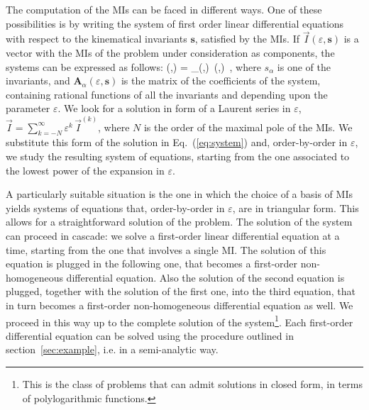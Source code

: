 The computation of the MIs can be faced in different ways. One of these possibilities is by writing the system of first order linear differential equations with respect to the kinematical invariants $\mathbf{s}$, satisfied by the MIs. If $\vec{I}(\varepsilon,\mathbf{s})$ is a vector with the MIs of the problem under consideration as components, the systems can be expressed as follows:
\be
\label{eq:system}
 (\varepsilon,)
= _\alpha(\varepsilon,)\, (\varepsilon,)\, ,
\ee
where $s_\alpha$ is one of the invariants, 
and $\mathbf{A}_\alpha(\varepsilon,\mathbf{s})$ is the matrix of the coefficients of the system, containing rational functions of all the invariants and depending upon the parameter $\varepsilon$. We look for a solution in form of a Laurent series in $\varepsilon$, $\vec{I}=\sum_{k=-N}^{\infty} \varepsilon^k \, \vec{I}^{(k)}$, where $N$ is the order of the maximal pole of the MIs. We substitute this form of the solution in Eq.~(\ref{eq:system}) and, order-by-order in $\varepsilon$, we study the resulting system of equations, starting from the one associated to the lowest power of the expansion in $\varepsilon$.

A particularly suitable situation is the one in which the choice of a basis of MIs yields systems of equations that, order-by-order in $\varepsilon$, are in triangular form. This allows for a straightforward solution of the problem. The solution of the system can proceed in cascade: we solve a first-order linear differential equation at a time, starting from the one that involves a single MI. The solution of this equation is plugged in the following one, that becomes a first-order non-homogeneous differential equation. Also the solution of the second equation is plugged, together with the solution of the first one, into the third equation, that in turn becomes a first-order non-homogeneous differential equation as well. We proceed in this way up to the complete solution of the system\footnote{This is the class of problems that can admit solutions in closed form, in terms of polylogarithmic functions.}.  
Each first-order differential equation can be solved using the procedure outlined in section~\ref{sec:example}, i.e. in a semi-analytic way.


